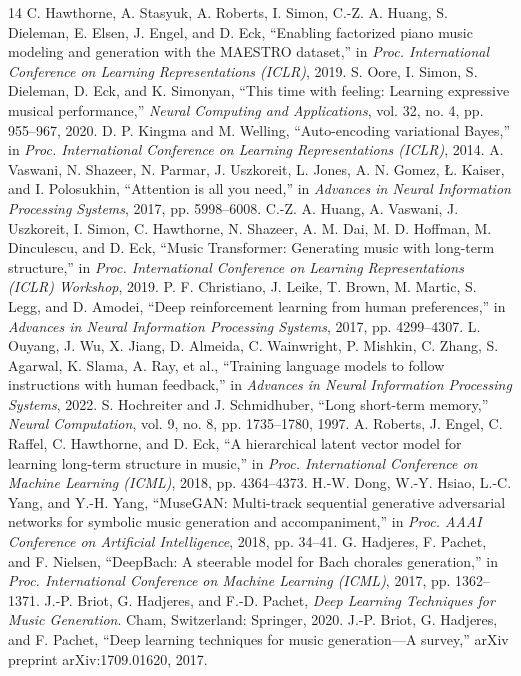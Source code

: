 \documentclass[conference]{IEEEtran}
\begin{document}
\begin{thebibliography}{14}
 C. Hawthorne, A. Stasyuk, A. Roberts, I. Simon, C.-Z. A. Huang, S. Dieleman, E. Elsen, J. Engel, and D. Eck, ``Enabling factorized piano music modeling and generation with the MAESTRO dataset,'' in \textit{Proc. International Conference on Learning Representations (ICLR)}, 2019.
 S. Oore, I. Simon, S. Dieleman, D. Eck, and K. Simonyan, ``This time with feeling: Learning expressive musical performance,'' \textit{Neural Computing and Applications}, vol. 32, no. 4, pp. 955--967, 2020.
 D. P. Kingma and M. Welling, ``Auto-encoding variational Bayes,'' in \textit{Proc. International Conference on Learning Representations (ICLR)}, 2014.
 A. Vaswani, N. Shazeer, N. Parmar, J. Uszkoreit, L. Jones, A. N. Gomez, \L. Kaiser, and I. Polosukhin, ``Attention is all you need,'' in \textit{Advances in Neural Information Processing Systems}, 2017, pp. 5998--6008.
 C.-Z. A. Huang, A. Vaswani, J. Uszkoreit, I. Simon, C. Hawthorne, N. Shazeer, A. M. Dai, M. D. Hoffman, M. Dinculescu, and D. Eck, ``Music Transformer: Generating music with long-term structure,'' in \textit{Proc. International Conference on Learning Representations (ICLR) Workshop}, 2019.
 P. F. Christiano, J. Leike, T. Brown, M. Martic, S. Legg, and D. Amodei, ``Deep reinforcement learning from human preferences,'' in \textit{Advances in Neural Information Processing Systems}, 2017, pp. 4299--4307.
 L. Ouyang, J. Wu, X. Jiang, D. Almeida, C. Wainwright, P. Mishkin, C. Zhang, S. Agarwal, K. Slama, A. Ray, et al., ``Training language models to follow instructions with human feedback,'' in \textit{Advances in Neural Information Processing Systems}, 2022.
 S. Hochreiter and J. Schmidhuber, ``Long short-term memory,'' \textit{Neural Computation}, vol. 9, no. 8, pp. 1735--1780, 1997.
 A. Roberts, J. Engel, C. Raffel, C. Hawthorne, and D. Eck, ``A hierarchical latent vector model for learning long-term structure in music,'' in \textit{Proc. International Conference on Machine Learning (ICML)}, 2018, pp. 4364--4373.
 H.-W. Dong, W.-Y. Hsiao, L.-C. Yang, and Y.-H. Yang, ``MuseGAN: Multi-track sequential generative adversarial networks for symbolic music generation and accompaniment,'' in \textit{Proc. AAAI Conference on Artificial Intelligence}, 2018, pp. 34--41.
 G. Hadjeres, F. Pachet, and F. Nielsen, ``DeepBach: A steerable model for Bach chorales generation,'' in \textit{Proc. International Conference on Machine Learning (ICML)}, 2017, pp. 1362--1371.
 J.-P. Briot, G. Hadjeres, and F.-D. Pachet, \textit{Deep Learning Techniques for Music Generation}. Cham, Switzerland: Springer, 2020.
 J.-P. Briot, G. Hadjeres, and F. Pachet, ``Deep learning techniques for music generation---A survey,'' arXiv preprint arXiv:1709.01620, 2017.
\end{thebibliography}
\end{document}
